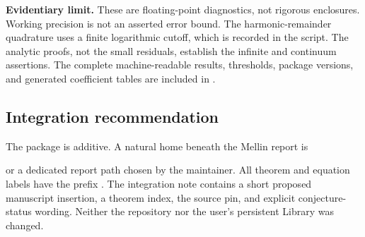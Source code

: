 \textbf{Evidentiary limit.} These are floating-point diagnostics, not
rigorous enclosures. Working precision is not an asserted error bound.
The harmonic-remainder quadrature uses a finite logarithmic cutoff,
which is recorded in the script. The analytic proofs, not the small
residuals, establish the infinite and continuum assertions. The complete
machine-readable results, thresholds, package versions, and generated
coefficient tables are included in .

\subsection{Integration recommendation}
The package is additive. A natural home beneath the Mellin report is
\begin{center}\small
{}
\end{center}
or a dedicated report path chosen by the maintainer.
All theorem and equation labels have the prefix .
The integration note contains a short proposed manuscript insertion,
a theorem index, the source pin, and explicit conjecture-status wording.
Neither the repository nor the user's persistent Library was changed.
